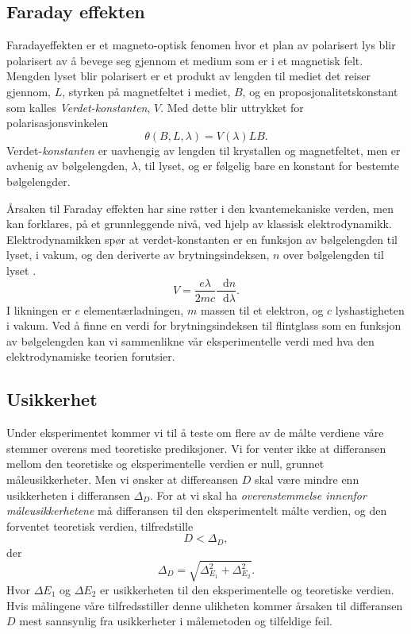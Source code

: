 \documentclass[%
 reprint,
 amsmath,amssymb,
 aps,
]{revtex4-1}
\newcommand*\diff{\mathop{}\!\mathrm{d}}
\begin{document}
\subsection{Faraday effekten}
Faradayeffekten er et magneto-optisk fenomen hvor et plan av polarisert lys blir polarisert av å bevege seg gjennom et medium som er i et magnetisk felt. Mengden lyset blir polarisert er et produkt av lengden til mediet det reiser gjennom, $L$, styrken på magnetfeltet i mediet, $B$, og en proposjonalitetskonstant som kalles \textit{Verdet-konstanten}, $V$. Med dette blir uttrykket for polarisasjonsvinkelen
\begin{equation}
  \theta\left(B, L, \lambda\right) = V\left(\lambda\right)LB.\label{verdet}
\end{equation}
Verdet-\textit{konstanten} er uavhengig av lengden til krystallen og magnetfeltet, men er avhenig av bølgelengden, $\lambda$, til lyset, og er følgelig bare en konstant for bestemte bølgelengder. \par
Årsaken til Faraday effekten har sine røtter i den kvantemekaniske verden, men kan forklares, på et grunnleggende nivå, ved hjelp av klassisk elektrodynamikk. Elektrodynamikken spør at verdet-konstanten er en funksjon av bølgelengden til lyset, i vakum, og den deriverte av brytningsindeksen, $n$ over bølgelengden til lyset \cite{pedrotti_faraday_1990}.
\begin{equation}
  V = \frac{e\lambda}{2mc} \frac{\diff n}{\diff\lambda}.
\end{equation}
I likningen er $e$ elementærladningen, $m$ massen til et elektron, og $c$ lyshastigheten i vakum. Ved å finne en verdi for brytningsindeksen til flintglass som en funksjon av bølgelengden kan vi sammenlikne vår eksperimentelle verdi med hva den elektrodynamiske teorien forutsier.
\subsection{Usikkerhet}
Under eksperimentet kommer vi til å teste om flere av de målte verdiene våre stemmer overens med teoretiske prediksjoner. Vi for venter ikke at differansen mellom den teoretiske og eksperimentelle verdien er null, grunnet måleusikkerheter. Men vi ønsker at differeansen $D$ skal være mindre enn usikkerheten i differansen $\Delta_D$. For at vi skal ha \textit{overenstemmelse innenfor måleusikkerhetene} må differansen til den eksperimentelt målte verdien, og den forventet teoretisk verdien, tilfredstille
\begin{equation}
  D < \Delta_D, \label{usikk1}
\end{equation}
der
\begin{equation}
  \Delta_D = \sqrt{\Delta_{E_1}^2 + \Delta_{E_2}^2}. \label{usikk2}
\end{equation}
Hvor $\Delta E_1$ og $\Delta E_2$ er usikkerheten til den eksperimentelle og teoretiske verdien.
Hvis målingene våre tilfredsstiller denne ulikheten kommer årsaken til differansen $D$ mest sannsynlig fra usikkerheter i målemetoden og tilfeldige feil.
\end{document}
